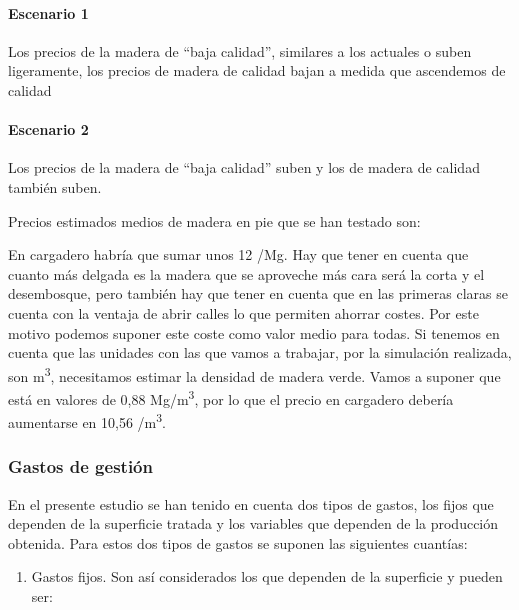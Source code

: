 \documentclass[
]{article}
\providecommand{\tightlist}{%
  \setlength{\itemsep}{0pt}\setlength{\parskip}{0pt}}
\begin{document}
\hypertarget{escenario-1}{%
\paragraph{Escenario 1}\label{escenario-1}}

Los precios de la madera de ``baja calidad'', similares a los actuales o
suben ligeramente, los precios de madera de calidad bajan a medida que
ascendemos de calidad

\hypertarget{escenario-2}{%
\paragraph{Escenario 2}\label{escenario-2}}

Los precios de la madera de ``baja calidad'' suben y los de madera de
calidad también suben.

Precios estimados medios de madera en pie que se han testado son:

En cargadero habría que sumar unos 12 /Mg. Hay que tener en cuenta que
cuanto más delgada es la madera que se aproveche más cara será la corta
y el desembosque, pero también hay que tener en cuenta que en las
primeras claras se cuenta con la ventaja de abrir calles lo que permiten
ahorrar costes. Por este motivo podemos suponer este coste como valor
medio para todas. Si tenemos en cuenta que las unidades con las que
vamos a trabajar, por la simulación realizada, son m\textsuperscript{3},
necesitamos estimar la densidad de madera verde. Vamos a suponer que
está en valores de 0,88 Mg/m\textsuperscript{3}, por lo que el precio en
cargadero debería aumentarse en 10,56 /m\textsuperscript{3}.

\hypertarget{gastos-de-gestiuxf3n}{%
\subsubsection{Gastos de gestión}\label{gastos-de-gestiuxf3n}}

En el presente estudio se han tenido en cuenta dos tipos de gastos, los
fijos que dependen de la superficie tratada y los variables que dependen
de la producción obtenida. Para estos dos tipos de gastos se suponen las
siguientes cuantías:

\begin{enumerate}
\def\labelenumi{\arabic{enumi}.}
\tightlist
\item
  Gastos fijos. Son así considerados los que dependen de la superficie y
  pueden ser:
\end{enumerate}
\end{document}
